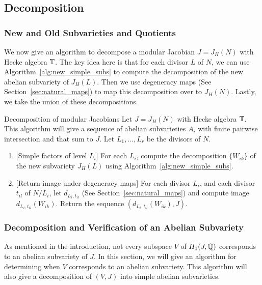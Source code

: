 \documentclass{article}
\begin{document}
\subsection{Decomposition}
\subsubsection{New and Old Subvarieties and Quotients}

We now give an algorithm to decompose a modular Jacobian $J=J_H(N)$ with Hecke
algebra $\mathbb{T}$. The key idea here is that for each divisor $L$ of $N$, we can use
Algorithm~\ref{alg:new_simple_subs} to compute the decomposition of the new
abelian subvariety of $J_H(L)$. Then we use degeneracy maps (See
Section~\ref{sec:natural_maps}) to map this decomposition over to $J_H(N)$.
Lastly, we take the union of these decompositions.

\begin{algorithm}{Decomposition of modular Jacobians}%
    \label{alg:decomp_jacobian}
    Let $J=J_H(N)$ with Hecke algebra $\mathbb{T}$. This algorithm will give a sequence
    of abelian subvarieties $A_i$ with finite pairwise intersection and that
    sum to $J$. Let $L_1,\ldots, L_r$ be the divisors of $N$.
    \begin{enumerate}
        \item{} [Simple factors of level $L_i$]
            For each $L_i$, compute the decomposition $\{W_{ik}\}$ of the new
            subvariety $J_H(L)$ using Algorithm~\ref{alg:new_simple_subs}.
        \item{} [Return image under degeneracy maps]
            For each divisor $L_i$, and each divisor $t_{il}$ of $N/L_i$, let
            $d_{L_i, t_{il}}$ (See Section~\ref{sec:natural_maps}) and compute
            image $d_{L_i, t_{il}}(W_{ik})$. Return the sequence $(d_{L_i,
            t_{il}}(W_{ik}), J)$.
    \end{enumerate}
\end{algorithm}

\subsubsection{Decomposition and Verification of an Abelian Subvariety}
\label{sec:decomp_verify}

As mentioned in the introduction, not every subspace $V$ of $H_1(J, \mathbb{Q})$
corresponds to an abelian subvariety of $J$. In this section, we will give an
algorithm for determining when $V$ corresponds to an abelian subvariety. This
algorithm will also give a decomposition of $(V, J)$ into simple abelian
subvarieties.
\end{document}
